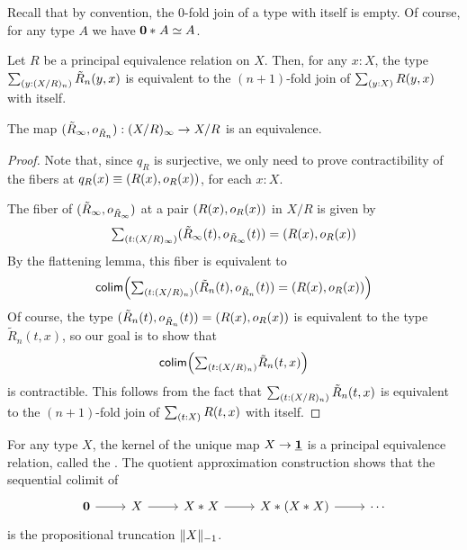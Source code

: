Recall that by convention, the $0$-fold join of a type with itself is empty. Of course, for any type $A$ we have $\join{\emptyt}{A}\eqvsym A$. 

\begin{cor}
Let $R$ be a principal equivalence relation on $X$. Then, for any $x:X$, the type $\sm{y:(X/R)_n}\tilde{R}_n(y,x)$ is equivalent to the $(n+1)$-fold join of $\sm{y:X}R(y,x)$ with itself. 
\end{cor}

\begin{thm}\label{thm:quotients_are_small}
The map $\pairr{\tilde{R}_\infty,o_{\tilde{R}_n}}:(X/R)_\infty \to X/R$ is an equivalence. 
\end{thm}

\begin{proof}
Note that, since $q_R$ is surjective, we only need to prove contractibility of the fibers at $q_R(x)\jdeq\pairr{R(x),o_R(x)}$, for each $x:X$. 

The fiber of $\pairr{\tilde{R}_\infty,o_{\tilde{R}_\infty}}$ at a pair $\pairr{R(x),o_R(x)}$ in $X/R$ is given by
\begin{equation*}
\sm{t:(X/R)_\infty} \pairr{\tilde{R}_\infty(t),o_{\tilde{R}_\infty}(t)}=\pairr{R(x),o_R(x)}
\end{equation*}
By the flattening lemma, this fiber is equivalent to
\begin{equation*}
\tfcolim\Big(\sm{t:(X/R)_n} \pairr{\tilde{R}_n(t),o_{\tilde{R}_n}(t)}=\pairr{R(x),o_R(x)}\Big)
\end{equation*}
Of course, the type $\pairr{\tilde{R}_n(t),o_{\tilde{R}_n}(t)}=\pairr{R(x),o_R(x)}$ is equivalent to the type $\tilde{R}_n(t,x)$, so our goal is to show that
\begin{equation*}
\tfcolim\Big(\sm{t:(X/R)_n}\tilde{R}_n(t,x)\Big)
\end{equation*}
is contractible. This follows from the fact that $\sm{t:(X/R)_n}\tilde{R}_n(t,x)$ is equivalent to the $(n+1)$-fold join of $\sm{t:X}R(t,x)$ with itself.
\end{proof}

\begin{eg}
For any type $X$, the kernel of the unique map $X\to\unit$ is a principal equivalence relation, called the . The quotient approximation construction shows that the sequential colimit of
\begin{equation*}
\begin{tikzcd}
\emptyt \arrow[r] & X \arrow[r] & \join{X}{X} \arrow[r] & \join{X}{(\join{X}{X})} \arrow[r] & \cdots
\end{tikzcd}
\end{equation*}
is the propositional truncation $\trunc{-1}{X}$. 
\end{eg}

